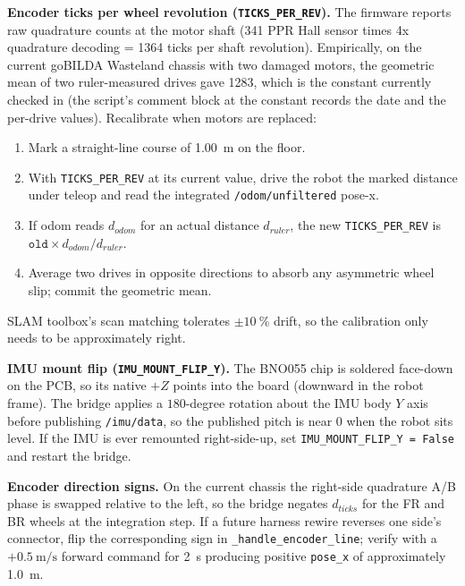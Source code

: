 \documentclass[11pt,letterpaper]{article}
\begin{document}
\textbf{Encoder ticks per wheel revolution
(\texttt{TICKS\_PER\_REV}).}
The firmware reports raw quadrature counts at the motor shaft
(341 PPR Hall sensor times 4x quadrature decoding =
\num{1364} ticks per shaft revolution). Empirically, on the current
goBILDA Wasteland chassis with two damaged motors, the geometric
mean of two ruler-measured drives gave \num{1283}, which is the
constant currently checked in (the script's comment block at the
constant records the date and the per-drive values). Recalibrate
when motors are replaced:
\begin{enumerate}[leftmargin=1.4em,itemsep=2pt]
\item Mark a straight-line course of \qty{1.00}{\meter} on the
      floor.
\item With \texttt{TICKS\_PER\_REV} at its current value, drive the
      robot the marked distance under teleop and read the integrated
      \texttt{/odom/unfiltered} pose-x.
\item If odom reads
      \(d_{odom}\) for an actual distance \(d_{ruler}\), the new
      \texttt{TICKS\_PER\_REV} is
      \(\texttt{old} \times d_{odom} / d_{ruler}\).
\item Average two drives in opposite directions to absorb any
      asymmetric wheel slip; commit the geometric mean.
\end{enumerate}
SLAM toolbox's scan matching tolerates \(\pm \qty{10}{\percent}\)
drift, so the calibration only needs to be approximately right.

\textbf{IMU mount flip
(\texttt{IMU\_MOUNT\_FLIP\_Y}).} The BNO055 chip is soldered
face-down on the PCB, so its native \(+Z\) points into the board
(downward in the robot frame). The bridge applies a
\(180\)-degree rotation about the IMU body \(Y\) axis before
publishing \texttt{/imu/data}, so the published pitch is near
\(0\) when the robot sits level. If the IMU is ever remounted
right-side-up, set \texttt{IMU\_MOUNT\_FLIP\_Y = False} and
restart the bridge.

\textbf{Encoder direction signs.} On the current chassis the
right-side quadrature A/B phase is swapped relative to the left,
so the bridge negates \(d_{ticks}\) for the FR and BR wheels at
the integration step. If a future harness rewire reverses one
side's connector, flip the corresponding sign in
\texttt{\_handle\_encoder\_line}; verify with a \(+\qty{0.5}{\meter\per\second}\)
forward command for \qty{2}{\second} producing positive
\texttt{pose\_x} of approximately \qty{1.0}{\meter}.
\end{document}
